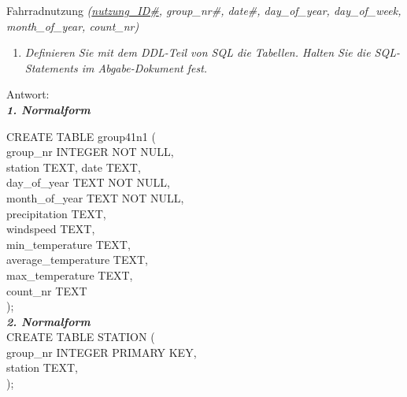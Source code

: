\documentclass{article}
\begin{document}
Fahrradnutzung \textit{(\underline{nutzung\_ID\#}, group\_nr\#, date\#, day\_of\_year, day\_of\_week, \\ \indent
\hspace{2.5cm} month\_of\_year, count\_nr)}



\begin{enumerate}[resume]
    \item \textit{Definieren Sie mit dem DDL-Teil von SQL die Tabellen. Halten Sie die SQL-Statements im Abgabe-Dokument fest.}
    \end{enumerate}

\noindent 
Antwort: \\
\textbf{\textit{1. Normalform}} 

CREATE TABLE group41n1 (  \\ \indent
\hspace{1cm} group\_nr INTEGER NOT NULL, \\ \indent
\hspace{1cm} station TEXT, date TEXT, \\ \indent
\hspace{1cm} day\_of\_year TEXT NOT NULL, \\ \indent
\hspace{1cm} month\_of\_year TEXT NOT NULL, \\ \indent
\hspace{1cm} precipitation TEXT, \\ \indent
\hspace{1cm} windspeed TEXT, \\ \indent
\hspace{1cm} min\_temperature TEXT, \\ \indent
\hspace{1cm} average\_temperature TEXT, \\ \indent
\hspace{1cm} max\_temperature TEXT, \\ \indent
\hspace{1cm} count\_nr TEXT \\ \indent
); \\ 




\textbf{\textit{2. Normalform}}\\

CREATE TABLE  STATION ( \\ \indent
\hspace{1cm} group\_nr INTEGER PRIMARY KEY, \\ \indent
\hspace{1cm} station TEXT, \\ \indent
); \\
\end{document}
